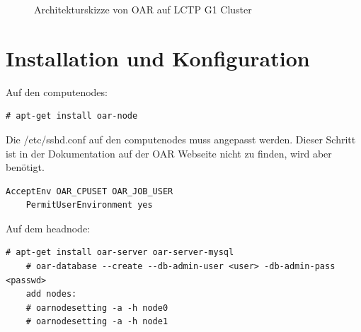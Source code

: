     \begin{figure}[h]
    \centering
{}
    \caption{Architekturskizze von OAR auf LCTP G1 Cluster} 
\end{figure}
\newpage

\section{Installation und Konfiguration}
    Auf den computenodes:
    \begin{lstlisting}[style=Bash]
    # apt-get install oar-node
	\end{lstlisting}
    Die /etc/sshd.conf auf den computenodes muss angepasst werden.
    Dieser Schritt ist in der Dokumentation auf der OAR Webseite nicht zu finden, wird aber benötigt.
    \begin{lstlisting}[style=Bash]
    AcceptEnv OAR_CPUSET OAR_JOB_USER
    PermitUserEnvironment yes
	\end{lstlisting}
    Auf dem headnode:
    \begin{lstlisting}[style=Bash]
    # apt-get install oar-server oar-server-mysql
    # oar-database --create --db-admin-user <user> -db-admin-pass <passwd>
    add nodes:
    # oarnodesetting -a -h node0
    # oarnodesetting -a -h node1
	\end{lstlisting}
	\newpage

